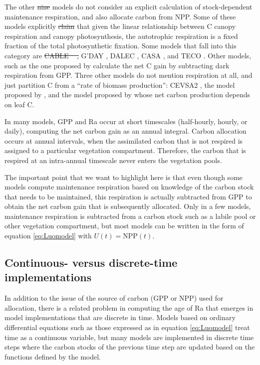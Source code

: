 \documentclass[bg, manuscript]{copernicus}
\providecommand{\DIFadd}[1]{{\protect\color{blue}\uwave{#1}}} %
\providecommand{\DIFdel}[1]{{\protect\color{red}\sout{#1}}}                      %
\providecommand{\DIFaddbegin}{} %
\providecommand{\DIFaddend}{} %
\providecommand{\DIFdelbegin}{} %
\providecommand{\DIFdelend}{} %
\begin{document}
The other \DIFdelbegin \DIFdel{nine }\DIFdelend \DIFaddbegin \DIFadd{eight }\DIFaddend models do not consider an explicit calculation of stock-dependent maintenance respiration, and also allocate carbon from NPP. Some of these models explicitly \DIFdelbegin \DIFdel{claim }\DIFdelend \DIFaddbegin \DIFadd{express }\DIFaddend that given the linear relationship between C canopy respiration and canopy photosynthesis, the autotrophic respiration is a fixed fraction of the total photosynthetic fixation. Some models that fall into this category are 
\DIFdelbegin \DIFdel{CABLE \mbox{%
\citep{Wang2010Biogeosciences}}\hspace{0pt}%
, }\DIFdelend G'DAY \citep{Comins1993EA}, DALEC \citep{Williams2005GCB}, CASA \citep{Potter1993GlobalBiogeochemCy}, and TECO \citep{Luo2012TE}. Other models, such as the one proposed by \citet{Hilbert1991AnnBot} calculate the net C gain by subtracting dark respiration from GPP. Three other models do not mention respiration at all, and just partition C from a ``rate of biomass production'': CEVSA2 \citep{Gu2010EcologicalComplexity}, the model proposed by \citet{King1993TreePhysiol}, and the model proposed by \citet{DeAngelis2012TheorEcol} whose net carbon production depends on leaf C. 

In many models, GPP and Ra occur at short timescales (half-hourly, hourly, or daily), computing the net carbon gain as an annual integral. Carbon allocation occurs at annual intervals, when the assimilated carbon that is not respired is assigned to a particular vegetation compartment. Therefore, the carbon that is respired at an intra-annual timescale never enters the vegetation pools.

The important point that we want to highlight here is that even though some models compute maintenance respiration based on knowledge of the carbon stock that needs to be maintained, this respiration is actually subtracted from GPP to obtain the net carbon gain that is subsequently allocated. Only in a few models, maintenance respiration is subtracted from a carbon stock such as a labile pool or other vegetation compartment, but most models can be written in the form of equation \eqref{eq:Luomodel} with $U(t) = \mathrm{NPP}(t)$. 

\subsection{Continuous- versus discrete-time implementations}
In addition to the issue of the source of carbon (GPP or NPP) used for allocation, there is a related problem in computing the age of Ra that emerges in model implementations that are discrete in time. 
Models based on ordinary differential equations such as those expressed as in equation \eqref{eq:Luomodel} treat time as a continuous variable, but many models are implemented in discrete time steps where the carbon stocks of the previous time step are updated based on the functions defined by the model. %
\end{document}
